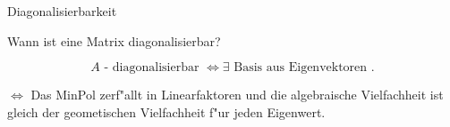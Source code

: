 \documentclass[class=article, crop=false]{standalone}
\begin{document}
\begin{zettel}{Diagonalisierbarkeit}
\begin{flashcard}[t21idtsx]{Wann ist eine Matrix diagonalisierbar?}
	\begin{definition}[diagonalisierbar]
		\[
			A \text{ - diagonalisierbar } \iff \exists \text{ Basis aus Eigenvektoren }
		.\]
	\end{definition}
\end{flashcard}

$\iff$  Das MinPol zerf"allt in Linearfaktoren und die algebraische Vielfachheit ist gleich der geometischen Vielfachheit f"ur jeden Eigenwert.

\end{zettel}
\end{document}
